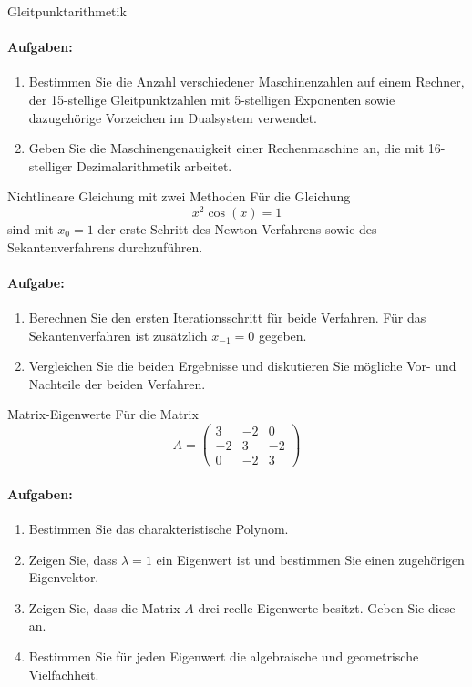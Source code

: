 \begin{example2}{Gleitpunktarithmetik}
\paragraph{Aufgaben:}
\begin{enumerate}
    \item Bestimmen Sie die Anzahl verschiedener Maschinenzahlen auf einem Rechner, der 15-stellige Gleitpunktzahlen mit 5-stelligen Exponenten sowie dazugehörige Vorzeichen im Dualsystem verwendet.
    
    \item Geben Sie die Maschinengenauigkeit einer Rechenmaschine an, die mit 16-stelliger Dezimalarithmetik arbeitet.
\end{enumerate}
\end{example2}

\begin{example2}{Nichtlineare Gleichung mit zwei Methoden}
Für die Gleichung
$$x^2\cos(x) = 1$$
sind mit $x_0 = 1$ der erste Schritt des Newton-Verfahrens sowie des Sekantenverfahrens durchzuführen.

\paragraph{Aufgabe:}
\begin{enumerate}
    \item Berechnen Sie den ersten Iterationsschritt für beide Verfahren. Für das Sekantenverfahren ist zusätzlich $x_{-1} = 0$ gegeben.
    
    \item Vergleichen Sie die beiden Ergebnisse und diskutieren Sie mögliche Vor- und Nachteile der beiden Verfahren.
\end{enumerate}
\end{example2}

\begin{example2}{Matrix-Eigenwerte}
Für die Matrix
$$A = \begin{pmatrix}
3 & -2 & 0\\
-2 & 3 & -2\\
0 & -2 & 3
\end{pmatrix}$$

\paragraph{Aufgaben:}
\begin{enumerate}
    \item Bestimmen Sie das charakteristische Polynom.
    
    \item Zeigen Sie, dass $\lambda = 1$ ein Eigenwert ist und bestimmen Sie einen zugehörigen Eigenvektor.
    
    \item Zeigen Sie, dass die Matrix $A$ drei reelle Eigenwerte besitzt. Geben Sie diese an.
    
    \item Bestimmen Sie für jeden Eigenwert die algebraische und geometrische Vielfachheit.
\end{enumerate}
\end{example2}

